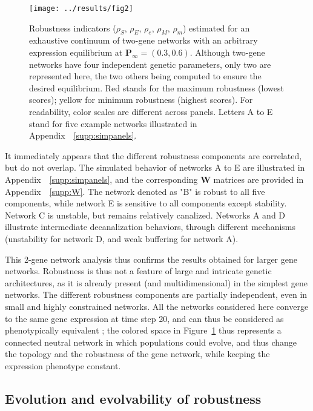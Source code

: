 \documentclass[10pt,a4paper]{article}
\newcommand{\stability}{{\rho_S}}
\newcommand{\earlyenv}{{\rho_E}}
\newcommand{\lateenv}{{\rho_e}}
\newcommand{\earlymut}{{\rho_M}}
\newcommand{\latemut}{{\rho_m}}
\newcommand{\SupMat}{Appendix~}
\begin{document}
\begin{figure}[t]
\begin{adjustwidth}{-1in}{0in}
\begin{flushright}
\texttt{[image: ../results/fig2]}
\caption{\color{Gray} \label{fig:imgpanels} Robustness indicators ($\stability$, $\earlyenv$, $\lateenv$, $\earlymut$, $\latemut$) estimated for an exhaustive continuum of two-gene networks with an arbitrary expression equilibrium at $\bm P_\infty = (0.3, 0.6)$. Although two-gene networks have four independent genetic parameters, only two are represented here, the two others being computed to ensure the desired equilibrium. Red stands for the maximum robustness (lowest scores); yellow for minimum robustness (highest scores). For readability, color scales are different across panels. Letters A to E stand for five example networks illustrated in \SupMat~\ref{supp:simpanels}.}
\end{flushright}\end{adjustwidth}
\end{figure}

It immediately appears that the different robustness components are correlated, but do not overlap. The simulated behavior of networks A to E are illustrated in \SupMat~\ref{supp:simpanels}, and the corresponding $\bm W$ matrices are provided in \SupMat~\ref{supp:W}. The network denoted as "B" is robust to all five components, while network E is sensitive to all components except stability. Network C is unstable, but remains relatively canalized. Networks A and D illustrate intermediate decanalization behaviors, through different mechanisms (unstability for network D, and weak buffering for network A). 

This 2-gene network analysis thus confirms the results obtained for larger gene networks. Robustness is thus not a feature of large and intricate genetic architectures, as it is already present (and multidimensional) in the simplest gene networks. The different robustness components are partially independent, even in small and highly constrained networks. All the networks considered here converge to the same gene expression at time step 20, and can thus be considered as phenotypically equivalent ; the colored space in Figure~\ref{fig:imgpanels} thus represents a connected neutral network in which populations could evolve, and thus change the topology and the robustness of the gene network, while keeping the expression phenotype constant. 

\subsection{Evolution and evolvability of robustness}
\end{document}
